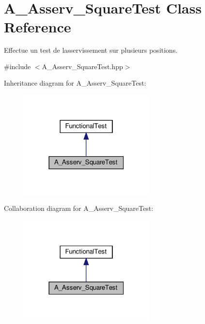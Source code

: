 \hypertarget{classA__Asserv__SquareTest}{}\section{A\+\_\+\+Asserv\+\_\+\+Square\+Test Class Reference}
\label{classA__Asserv__SquareTest}


Effectue un test de l\textquotesingle{}asservissement sur plusieurs positions.  




{\ttfamily \#include $<$A\+\_\+\+Asserv\+\_\+\+Square\+Test.\+hpp$>$}



Inheritance diagram for A\+\_\+\+Asserv\+\_\+\+Square\+Test\+:
\nopagebreak
\begin{figure}[H]
\begin{center}
\leavevmode
\includegraphics[width=195pt]{classA__Asserv__SquareTest__inherit__graph}
\end{center}
\end{figure}


Collaboration diagram for A\+\_\+\+Asserv\+\_\+\+Square\+Test\+:
\nopagebreak
\begin{figure}[H]
\begin{center}
\leavevmode
\includegraphics[width=195pt]{classA__Asserv__SquareTest__coll__graph}
\end{center}
\end{figure}
